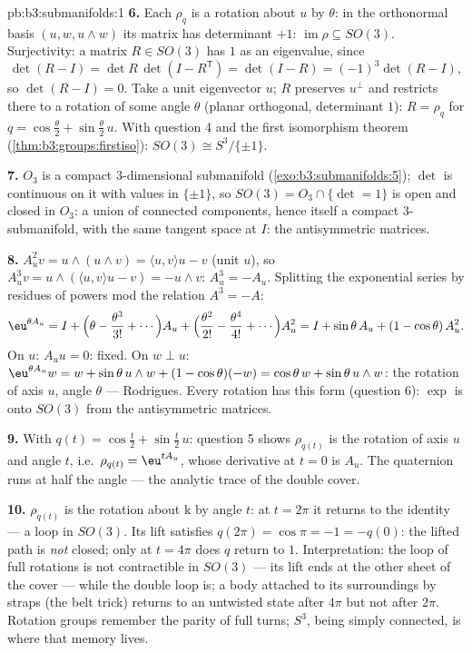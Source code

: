 \begin{solution}{pb:b3:submanifolds:1}
\textbf{6.} Each $\rho_q$ is a rotation about $u$ by
$\theta$: in the orthonormal basis $(u, w, u\wedge w)$ its
matrix has determinant $+1$: $\operatorname{im}\rho \subseteq
SO(3)$. Surjectivity: a matrix $R \in SO(3)$ has $1$ as an
eigenvalue, since
\[
\det(R - I) = \det R\,\det(I - R^{\mathsf T}) = \det(I - R)
= (-1)^3\det(R - I),
\]
so $\det(R - I) = 0$. Take a unit eigenvector $u$; $R$
preserves $u^\perp$ and restricts there to a rotation of
some angle $\theta$ (planar orthogonal, determinant $1$):
$R = \rho_q$ for $q = \cos\frac\theta2 +
\sin\frac\theta2\,u$. With question 4 and the first
isomorphism theorem (\cref{thm:b3:groups:firstiso}): $SO(3)
\cong S^3/\{\pm1\}$.

\textbf{7.} $O_3$ is a compact $3$-dimensional submanifold
(\cref{exo:b3:submanifolds:5}); $\det$ is continuous on it
with values in $\{\pm1\}$, so $SO(3) = O_3\cap\{\det = 1\}$
is open and closed in $O_3$: a union of connected components,
hence itself a compact $3$-submanifold, with the same tangent
space at $I$: the antisymmetric matrices.

\textbf{8.} $A_u^2v = u\wedge(u\wedge v) = \langle u,
v\rangle u - v$ (unit $u$), so $A_u^3v = u\wedge(\langle
u,v\rangle u - v) = -u\wedge v$: $A_u^3 = -A_u$. Splitting
the exponential series by residues of powers mod the relation
$A^3 = -A$:
\[
\eu^{\theta A_u} = I + \Bigl(\theta - \frac{\theta^3}{3!} +
\cdots\Bigr)A_u + \Bigl(\frac{\theta^2}{2!} -
\frac{\theta^4}{4!} + \cdots\Bigr)A_u^2
= I + \sin\theta\,A_u + (1 - \cos\theta)\,A_u^2 .
\]
On $u$: $A_uu = 0$: fixed. On $w \perp u$: $\eu^{\theta
A_u}w = w + \sin\theta\,u\wedge w + (1 - \cos\theta)(-w) =
\cos\theta\,w + \sin\theta\,u\wedge w$: the rotation of axis
$u$, angle $\theta$ --- Rodrigues. Every rotation has this
form (question 6): $\exp$ is onto $SO(3)$ from the
antisymmetric matrices.

\textbf{9.} With $q(t) = \cos\frac t2 + \sin\frac t2\,u$:
question 5 shows $\rho_{q(t)}$ is the rotation of axis $u$
and angle $t$, i.e.\ $\rho_{q(t)} = \eu^{tA_u}$, whose
derivative at $t = 0$ is $A_u$. The quaternion runs at half
the angle --- the analytic trace of the double cover.

\textbf{10.} $\rho_{q(t)}$ is the rotation about $\mathrm k$
by angle $t$: at $t = 2\pi$ it returns to the identity ---
a loop in $SO(3)$. Its lift satisfies $q(2\pi) = \cos\pi =
-1 = -q(0)$: the lifted path is \emph{not} closed; only at
$t = 4\pi$ does $q$ return to $1$. Interpretation: the loop
of full rotations is not contractible in $SO(3)$ --- its
lift ends at the other sheet of the cover --- while the
double loop is; a body attached to its surroundings by
straps (the belt trick) returns to an untwisted state after
$4\pi$ but not after $2\pi$. Rotation groups remember the
parity of full turns; $S^3$, being simply connected, is
where that memory lives.


\end{solution}
